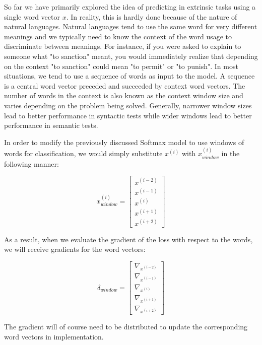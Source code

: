 \documentclass{tufte-handout}
\begin{document}
So far we have primarily explored the idea of predicting in extrinsic tasks using a single word vector $x$. In reality, this is hardly done because of the nature of natural languages. Natural languages tend to use the same word for very different meanings and we typically need to know the context of the word usage to discriminate between meanings. For instance, if you were asked to explain to someone what "to sanction" meant, you would immediately realize that depending on the context "to sanction" could mean "to permit" or "to punish". In most situations, we tend to use a sequence of words as input to the model. A sequence is a central word vector preceded and succeeded by context word vectors. The number of words in the context is also known as the context window size and varies depending on the problem being solved. Generally, narrower window sizes lead to better performance in syntactic tests while wider windows lead to better performance in semantic tests.


In order to modify the previously discussed Softmax model to use windows of words for classification, we would simply substitute $x^{(i)}$ with  $x_{window}^{(i)}$ in the following manner:

$$x_{window}^{(i)} = \left[ \begin{array}{c} x^{(i-2)} \\ x^{(i-1)} \\ x^{(i)} \\ x^{(i+1)} \\ x^{(i+2)} \end{array} \right] $$

As a result, when we evaluate the gradient of the loss with respect to the words, we will receive gradients for the word vectors:

$$\delta_{window} = \left[ \begin{array}{c} \nabla_{x^{(i-2)}} \\ \nabla_{x^{(i-1)}} \\ \nabla_{x^{(i)}} \\ \nabla_{x^{(i+1)}} \\ \nabla_{x^{(i+2)}} \end{array} \right] $$

The gradient will of course need to be distributed to update the corresponding word vectors in implementation.
\end{document}
